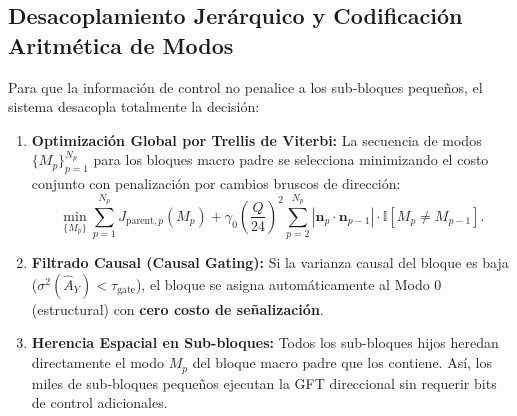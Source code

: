 \documentclass[11pt,a4paper]{article}
\begin{document}
\subsection{Desacoplamiento Jerárquico y Codificación Aritmética de Modos}
Para que la información de control no penalice a los sub-bloques pequeños, el sistema desacopla totalmente la decisión:
\begin{enumerate}
  \item \textbf{Optimización Global por Trellis de Viterbi:} La secuencia de modos $\{M_p\}_{p=1}^{N_p}$ para los bloques macro padre se selecciona minimizando el costo conjunto con penalización por cambios bruscos de dirección:
  \begin{equation}
    \min_{\{M_p\}} \sum_{p=1}^{N_p} J_{\text{parent},p}(M_p) + \gamma_0 \left(\frac{Q}{24}\right)^2 \sum_{p=2}^{N_p} |\mathbf{n}_p \cdot \mathbf{n}_{p-1}| \cdot \mathbb{I}[M_p \ne M_{p-1}].
  \end{equation}
  \item \textbf{Filtrado Causal (Causal Gating):} Si la varianza causal del bloque es baja ($\sigma^2(\hat{A}_Y) < \tau_{\text{gate}}$), el bloque se asigna automáticamente al Modo 0 (estructural) con \textbf{cero costo de señalización}.
  \item \textbf{Herencia Espacial en Sub-bloques:} Todos los sub-bloques hijos heredan directamente el modo $M_p$ del bloque macro padre que los contiene. Así, los miles de sub-bloques pequeños ejecutan la GFT direccional sin requerir bits de control adicionales.
\end{enumerate}
\end{document}
